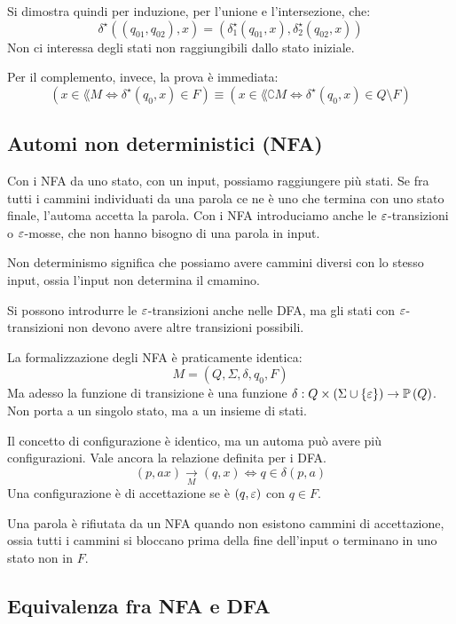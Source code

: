 Si dimostra quindi per induzione, per l'unione e l'intersezione, che:
\[
	\delta^{\star} \left( ( q_{01}, q_{02}), x \right) = \left( \delta_1^{\star} (q_{01}, x), \delta_2^{\star} (q_{02}, x) \right)
\]
Non ci interessa degli stati non raggiungibili dallo stato iniziale.

Per il complemento, invece, la prova \`e immediata:
\[
	\left( x \in \lang{M} \iff \delta^{\star} (q_0, x) \in F \right) \equiv \left( x \in \lang{\complement M} \iff \delta^{\star} (q_0, x) \in Q \setminus F \right)
\]

\subsection{Automi non deterministici (NFA)}

Con i NFA da uno stato, con un input, possiamo raggiungere pi\`u stati.
Se fra tutti i cammini individuati da una parola ce ne \`e uno che termina con uno stato finale, l'automa accetta la parola.
Con i NFA introduciamo anche le $\varepsilon$-transizioni o $\varepsilon$-mosse, che non hanno bisogno di una parola in input.

Non determinismo significa che possiamo avere cammini diversi con lo stesso input, ossia l'input non determina il cmamino.

Si possono introdurre le $\varepsilon$-transizioni anche nelle DFA, ma gli stati con $\varepsilon$-transizioni non devono avere altre transizioni possibili.

La formalizzazione degli NFA \`e praticamente identica:
\[
	M = (Q, \Sigma, \delta, q_0, F)
\]
Ma adesso la funzione di transizione \`e una funzione $\delta : Q \times \left( \Sigma \cup \{ \varepsilon \} \right) \to \mathbb{P} \left( {Q} \right)$.
Non porta a un singolo stato, ma a un insieme di stati.

Il concetto di configurazione \`e identico, ma un automa pu\`o avere pi\`u configurazioni.
Vale ancora la relazione definita per i DFA.
\[
	(p, ax) \underset{M}{\to} (q,x) \iff q \in \delta(p,a)
\]
Una configurazione \`e di accettazione se \`e $(q, \varepsilon)$ con $q \in F$.

Una parola \`e rifiutata da un NFA quando non esistono cammini di accettazione, ossia tutti i cammini si bloccano prima della fine dell'input o terminano in uno stato non in $F$.

\subsection{Equivalenza fra NFA e DFA}


